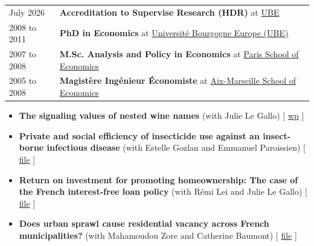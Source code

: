 \documentclass[12pt, a4paper]{./style}
\begin{document}
\begin{center}
\begin{tabular}{ll}
July 2026 & \textbf{Accreditation to Supervise Research (HDR)} at \href{http://en.u-bourgogne.fr/}{UBE}\\
2008 to 2011 & \textbf{PhD in Economics} at \href{http://en.u-bourgogne.fr/}{Université Bourgogne Europe (UBE)}\\
2007 to 2008 & \textbf{M.Sc. Analysis and Policy in Economics} at \href{https://www.parisschoolofeconomics.eu/en/}{Paris School of Economics}\\
2005 to 2008 & \textbf{Magistère Ingénieur Économiste} at \href{https://www.amse-aixmarseille.fr/en}{Aix-Marseille School of Economics}\\
\end{tabular}
\end{center}
\label{sec:org8b8d5af}

\begin{itemize}
\item \textbf{The signaling values of nested wine names} (with Julie
Le Gallo) [ \href{https://wine-economics.org/wp-content/uploads/2021/05/AAWE\_WP265.pdf}{wp} ]
\item \textbf{Private and social efficiency of insecticide use against an
insect-borne infectious disease} (with Estelle Gozlan and
Emmanuel Paroissien) [ \href{doc/RISCA-FILE.pdf}{file} ]
\item \textbf{Return on investment for promoting homeownership: The case of
the French interest-free loan policy} (with Rémi Lei and Julie Le
Gallo) [ \href{doc/CEREM-FILE.pdf}{file} ]
\item \textbf{Does urban sprawl cause residential vacancy across French
municipalities?} (with Mahamoudou Zore and Catherine Baumont) [
\href{doc/ZORE-FILE.pdf}{file} ]
\end{itemize}
\label{sec:org7ca0311}
\label{sec:org6fc867c}
\end{document}
